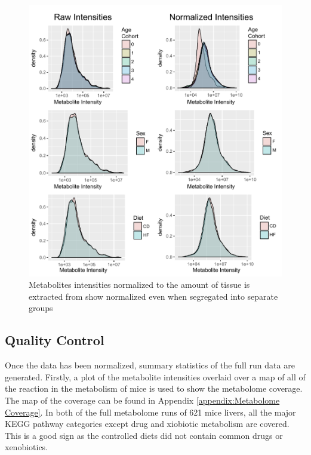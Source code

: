 \documentclass[a4paper]{book}
\begin{document}
	\begin{figure}[ht!b]
		\centering
		\includegraphics[width=0.6\linewidth]{3.Metabolomics/Factor_Densities_Final.pdf}
		\caption{Metabolites intensities normalized to the amount of tissue is extracted from show normalized even when segregated into separate groups}
		\label{fig: Meatbolite Data Normalization}
	\end{figure}
	
	\subsection{Quality Control}
	
	Once the data has been normalized, summary statistics of the full run data are generated. Firstly, a plot of the metabolite intensities overlaid over a map of all of the reaction in the metabolism of mice is used to show the metabolome coverage. The map of the coverage can be found in Appendix \ref{appendix:Metabolome Coverage}. In both of the full metabolome runs of 621 mice livers, all the major KEGG pathway categories except drug and xiobiotic metabolism are covered. This is a good sign as the controlled diets did not contain common drugs or xenobiotics. 
	
\end{document}
